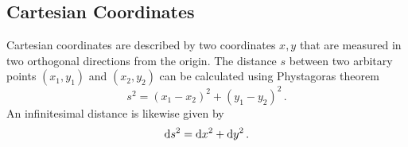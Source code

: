 \subsection*{Cartesian Coordinates}
Cartesian coordinates are described by two coordinates $x,y$ that are measured
in two orthogonal directions from the origin. The distance $s$ between two
arbitary points $(x_1,y_1)$ and $(x_2,y_2)$ can be calculated using Phystagoras
theorem
\begin{equation}
    s^2=(x_1-x_2)^2+(y_1-y_2)^2\,.
\end{equation}
An infinitesimal distance is likewise given by
\begin{equation}
    \dif s^2=\dif x^2+\dif y^2\,.  \label{eq:cartline}
\end{equation}
